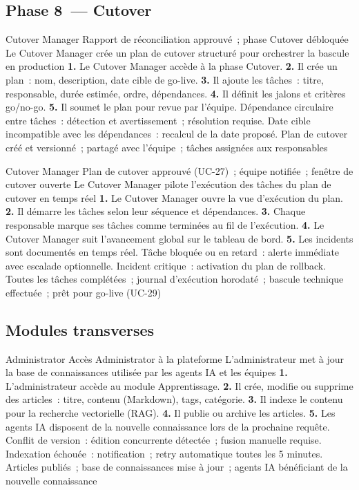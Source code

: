\subsection*{Phase 8~--- Cutover}

  {Cutover Manager}
  {Rapport de réconciliation approuvé~; phase Cutover débloquée}
  {Le Cutover Manager crée un plan de cutover structuré pour orchestrer la bascule en production}
  {\textbf{1.} Le Cutover Manager accède à la phase Cutover. \textbf{2.} Il crée un plan~: nom, description, date cible de go-live. \textbf{3.} Il ajoute les tâches~: titre, responsable, durée estimée, ordre, dépendances. \textbf{4.} Il définit les jalons et critères go/no-go. \textbf{5.} Il soumet le plan pour revue par l'équipe.}
  {Dépendance circulaire entre tâches~: détection et avertissement~; résolution requise. Date cible incompatible avec les dépendances~: recalcul de la date proposé.}
  {Plan de cutover créé et versionné~; partagé avec l'équipe~; tâches assignées aux responsables}

  {Cutover Manager}
  {Plan de cutover approuvé (UC-27)~; équipe notifiée~; fenêtre de cutover ouverte}
  {Le Cutover Manager pilote l'exécution des tâches du plan de cutover en temps réel}
  {\textbf{1.} Le Cutover Manager ouvre la vue d'exécution du plan. \textbf{2.} Il démarre les tâches selon leur séquence et dépendances. \textbf{3.} Chaque responsable marque ses tâches comme terminées au fil de l'exécution. \textbf{4.} Le Cutover Manager suit l'avancement global sur le tableau de bord. \textbf{5.} Les incidents sont documentés en temps réel.}
  {Tâche bloquée ou en retard~: alerte immédiate avec escalade optionnelle. Incident critique~: activation du plan de rollback.}
  {Toutes les tâches complétées~; journal d'exécution horodaté~; bascule technique effectuée~; prêt pour go-live (UC-29)}

\subsection*{Modules transverses}

  {Administrator}
  {Accès Administrator à la plateforme}
  {L'administrateur met à jour la base de connaissances utilisée par les agents IA et les équipes}
  {\textbf{1.} L'administrateur accède au module Apprentissage. \textbf{2.} Il crée, modifie ou supprime des articles~: titre, contenu (Markdown), tags, catégorie. \textbf{3.} Il indexe le contenu pour la recherche vectorielle (RAG). \textbf{4.} Il publie ou archive les articles. \textbf{5.} Les agents IA disposent de la nouvelle connaissance lors de la prochaine requête.}
  {Conflit de version~: édition concurrente détectée~; fusion manuelle requise. Indexation échouée~: notification~; retry automatique toutes les 5 minutes.}
  {Articles publiés~; base de connaissances mise à jour~; agents IA bénéficiant de la nouvelle connaissance}

